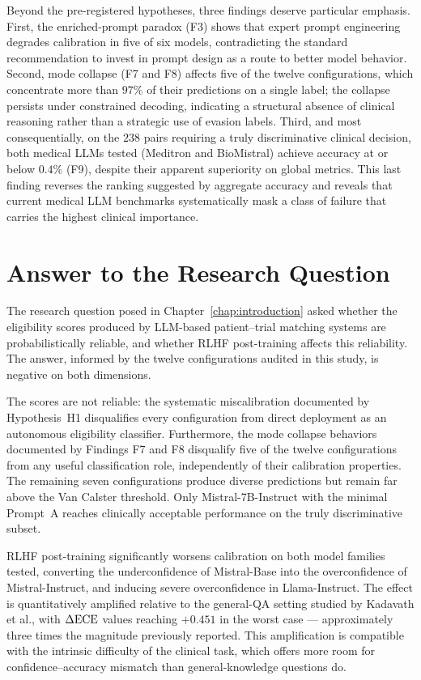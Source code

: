 Beyond the pre-registered hypotheses, three findings deserve particular 
emphasis. First, the enriched-prompt paradox (F3) shows that expert 
prompt engineering degrades calibration in five of six models, 
contradicting the standard recommendation to invest in prompt design as 
a route to better model behavior. Second, mode collapse (F7 and F8) 
affects five of the twelve configurations, which concentrate more than 
$97\%$ of their predictions on a single label; the collapse persists 
under constrained decoding, indicating a structural absence of clinical 
reasoning rather than a strategic use of evasion labels. Third, and 
most consequentially, on the $238$ pairs requiring a truly 
discriminative clinical decision, both medical LLMs tested (Meditron 
and BioMistral) achieve accuracy at or below $0.4\%$ (F9), despite 
their apparent superiority on global metrics. This last finding 
reverses the ranking suggested by aggregate accuracy and reveals that 
current medical LLM benchmarks systematically mask a class of failure 
that carries the highest clinical importance.

\section{Answer to the Research Question}
\label{sec:conc-answer}

The research question posed in Chapter~\ref{chap:introduction} asked 
whether the eligibility scores produced by LLM-based patient--trial 
matching systems are probabilistically reliable, and whether RLHF 
post-training affects this reliability. The answer, informed by the 
twelve configurations audited in this study, is negative on both 
dimensions.

The scores are not reliable: the systematic miscalibration documented 
by Hypothesis~H1 disqualifies every configuration from direct 
deployment as an autonomous eligibility classifier. Furthermore, the 
mode collapse behaviors documented by Findings F7 and F8 disqualify 
five of the twelve configurations from any useful classification role, 
independently of their calibration properties. The remaining seven 
configurations produce diverse predictions but remain far above the 
Van Calster threshold. Only Mistral-7B-Instruct with the minimal 
Prompt~A reaches clinically acceptable performance on the truly 
discriminative subset.

RLHF post-training significantly worsens calibration on both model 
families tested, converting the underconfidence of Mistral-Base into 
the overconfidence of Mistral-Instruct, and inducing severe 
overconfidence in Llama-Instruct. The effect is quantitatively 
amplified relative to the general-QA setting studied by Kadavath 
et al., with $\Delta\textrm{ECE}$ values reaching $+0.451$ in the worst case 
--- approximately three times the magnitude previously reported. This 
amplification is compatible with the intrinsic difficulty of the 
clinical task, which offers more room for confidence--accuracy 
mismatch than general-knowledge questions do.


